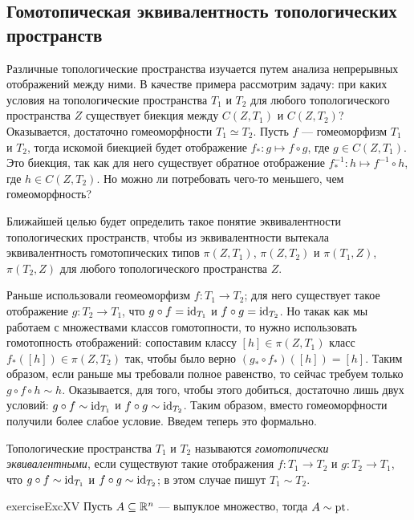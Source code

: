 \documentclass[main]{subfiles}
\begin{document}
\subsection{Гомотопическая эквивалентность топологических пространств}

Различные топологические пространства изучается путем анализа непрерывных отображений между ними. В качестве примера
рассмотрим задачу: при каких условия на топологические пространства $ T_1 $ и $ T_2 $ для любого топологического
пространства $ Z $ существует биекция между $ C(Z, T_1) $ и $ C(Z, T_2) $? Оказывается, достаточно гомеоморфности
$ T_1 \simeq T_2 $. Пусть $ f $ --- гомеоморфизм $ T_1 $ и $ T_2 $, тогда искомой биекцией будет отображение
$ f_* \colon g \mapsto f \circ g $, где $ g \in C(Z, T_1) $. Это биекция, так как для него существует
обратное отображение $ f_*^{-1} \colon h \mapsto f^{-1} \circ h $, где $ h \in C(Z, T_2) $. Но можно ли потребовать
чего-то меньшего, чем гомеоморфность?

Ближайшей целью будет определить такое понятие эквивалентности топологических пространств, чтобы из эквивалентности
вытекала эквивалентность гомотопических типов $ \pi(Z, T_1) $, $ \pi(Z, T_2) $ и $ \pi(T_1, Z) $, $ \pi(T_2, Z) $
для любого топологического пространства $ Z $.

Раньше использовали геомеоморфизм $ f \colon T_1 \to T_2 $; для него существует такое отображение
$ g \colon T_2 \to T_1 $, что  $ g \circ f = \operatorname{id}_{T_1} $ и $ f \circ g = \operatorname{id}_{T_2} $. Но такак как мы работаем с
множествами классов гомотопности, то нужно использовать гомотопность отображений: сопоставим классу
$ [h] \in \pi(Z, T_1) $ класс $ f_*([h]) \in \pi(Z, T_2) $ так, чтобы было верно $ (g_* \circ f_*) ([h]) = [h] $.
Таким образом, если раньше мы требовали полное равенство, то сейчас требуем только
$ g \circ f \circ h \sim h $. Оказывается, для того, чтобы этого добиться, достаточно лишь двух условий:
$ g \circ f \sim \operatorname{id}_{T_1} $ и $ f \circ g \sim \operatorname{id}_{T_2} $. Таким образом, вместо гомеоморфности получили
более слабое условие. Введем теперь это формально.

\begin{definition}
	Топологические пространства $ T_1 $ и $ T_2 $ называются \emph{гомотопически эквивалентными}, если существуют такие
	отображения $ f \colon T_1 \to T_2 $ и $ g \colon T_2 \to T_1 $, что $ g \circ f \sim \operatorname{id}_{T_1} $ и
	$ f \circ g \sim \operatorname{id}_{T_2} $; в этом случае пишут $ T_1 \sim T_2 $.
\end{definition}

\begin{restatable}{exercise}{ExcXV}
	Пусть $ A \subseteq \mathbb{R}^n $ --- выпуклое множество, тогда $ A \sim \operatorname{pt} $.
\end{restatable}
\end{document}
